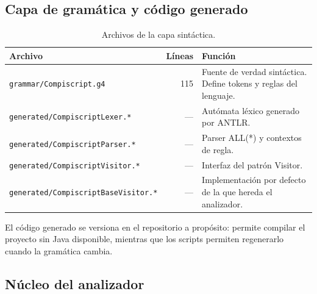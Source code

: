\documentclass[11pt,a4paper]{article}
\begin{document}
\subsection{Capa de gramática y código generado}

\begin{table}[H]
\centering
\small
\begin{tabular}{@{}L{6.3cm}rL{6.3cm}@{}}
\toprule
\textbf{Archivo} & \textbf{Líneas} & \textbf{Función} \\
\midrule
\texttt{grammar/Compiscript.g4} & 115 &
Fuente de verdad sintáctica. Define tokens y reglas del lenguaje. \\
\texttt{generated/CompiscriptLexer.*} & --- &
Autómata léxico generado por ANTLR. \\
\texttt{generated/CompiscriptParser.*} & --- &
Parser ALL(*) y contextos de regla. \\
\texttt{generated/CompiscriptVisitor.*} & --- &
Interfaz del patrón Visitor. \\
\texttt{generated/CompiscriptBaseVisitor.*} & --- &
Implementación por defecto de la que hereda el analizador. \\
\bottomrule
\end{tabular}
\caption{Archivos de la capa sintáctica.}
\end{table}

El código generado se versiona en el repositorio a propósito: permite compilar
el proyecto sin Java disponible, mientras que los scripts permiten regenerarlo
cuando la gramática cambia.

\subsection{Núcleo del analizador}
\end{document}
